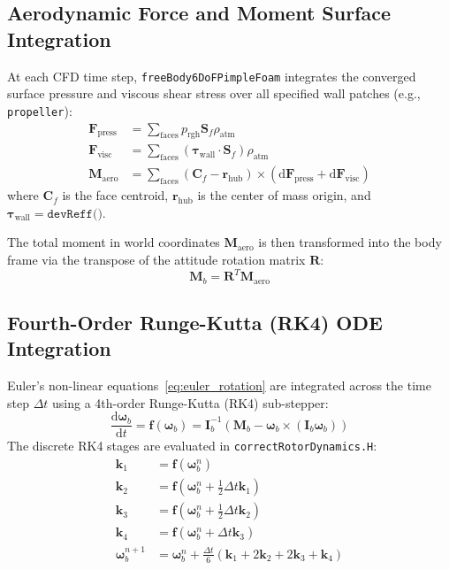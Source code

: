 \documentclass[11pt,a4paper]{article}
\newcommand{\vect}[1]{\mathbf{#1}}
\newcommand{\tensor}[1]{\bm{#1}}
\newcommand{\dderiv}[2]{\frac{\mathrm{d} #1}{\mathrm{d} #2}}
\newcommand{\prgh}{p_{\mathrm{rgh}}}
\newcommand{\maero}{\vect{M}_{\mathrm{aero}}}
\newcommand{\omegab}{\bm{\omega}_b}
\begin{document}
\subsection{Aerodynamic Force and Moment Surface Integration}
At each CFD time step, \texttt{freeBody6DoFPimpleFoam} integrates the converged surface pressure and viscous shear stress over all specified wall patches (e.g., \texttt{propeller}):
\begin{align}
    \vect{F}_{\mathrm{press}} &= \sum_{\mathrm{faces}} \prgh \vect{S}_f \rho_{\mathrm{atm}} \\
    \vect{F}_{\mathrm{visc}}  &= \sum_{\mathrm{faces}} (\tensor{\tau}_{\mathrm{wall}} \cdot \vect{S}_f) \rho_{\mathrm{atm}} \\
    \maero &= \sum_{\mathrm{faces}} (\vect{C}_f - \vect{r}_{\mathrm{hub}}) \times \left( \mathrm{d}\vect{F}_{\mathrm{press}} + \mathrm{d}\vect{F}_{\mathrm{visc}} \right)
\end{align}
where $\vect{C}_f$ is the face centroid, $\vect{r}_{\mathrm{hub}}$ is the center of mass origin, and $\tensor{\tau}_{\mathrm{wall}} = \texttt{devReff()}$.

The total moment in world coordinates $\maero$ is then transformed into the body frame via the transpose of the attitude rotation matrix $\tensor{R}$:
\begin{equation}
    \vect{M}_b = \tensor{R}^T \maero
\end{equation}

\subsection{Fourth-Order Runge-Kutta (RK4) ODE Integration}
Euler's non-linear equations~\eqref{eq:euler_rotation} are integrated across the time step $\Delta t$ using a 4th-order Runge-Kutta (RK4) sub-stepper:
\begin{equation}
    \dderiv{\omegab}{t} = \vect{f}(\omegab) = \tensor{I}_b^{-1} \left( \vect{M}_b - \omegab \times (\tensor{I}_b \omegab) \right)
\end{equation}
The discrete RK4 stages are evaluated in \texttt{correctRotorDynamics.H}:
\begin{equation}
    \begin{aligned}
        \vect{k}_1 &= \vect{f}(\omegab^n) \\
        \vect{k}_2 &= \vect{f}\left(\omegab^n + \tfrac{1}{2}\Delta t \vect{k}_1\right) \\
        \vect{k}_3 &= \vect{f}\left(\omegab^n + \tfrac{1}{2}\Delta t \vect{k}_2\right) \\
        \vect{k}_4 &= \vect{f}(\omegab^n + \Delta t \vect{k}_3) \\
        \omegab^{n+1} &= \omegab^n + \frac{\Delta t}{6} \left( \vect{k}_1 + 2\vect{k}_2 + 2\vect{k}_3 + \vect{k}_4 \right)
    \end{aligned}
\end{equation}
\end{document}
